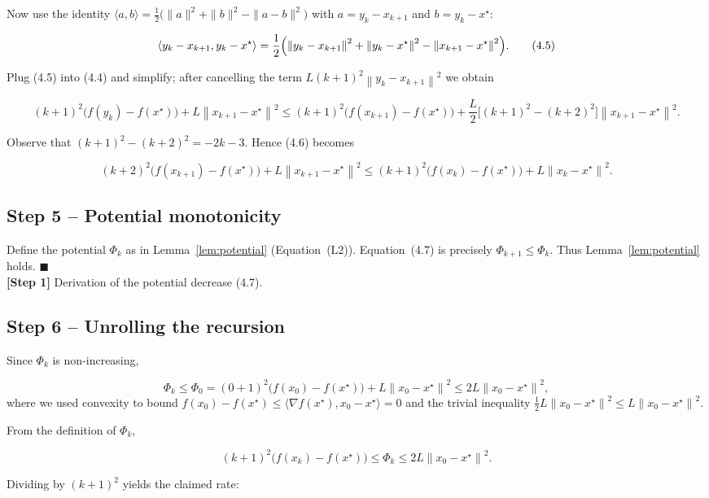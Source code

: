 \documentclass{article}
\newcommand{\grad}{\nabla}
\newcommand{\norm}[1]{\left\|#1\right\|}
\begin{document}
Now use the identity  
\(\langle a,b\rangle = \frac12\bigl(\|a\|^{2}+\|b\|^{2}-\|a-b\|^{2}\bigr)\) with
\(a=y_k-x_{k+1}\) and \(b=y_k-x^{\star}\):

\[
\langle y_k-x_{k+1},y_k-x^{\star}\rangle
 =\frac12\Bigl(\norm{y_k-x_{k+1}}^{2}
                +\norm{y_k-x^{\star}}^{2}
                -\norm{x_{k+1}-x^{\star}}^{2}\Bigr).
\tag{4.5}
\]

Plug (4.5) into (4.4) and simplify; after cancelling the term
\(L(k+1)^{2}\norm{y_k-x_{k+1}}^{2}\) we obtain

\[
(k+1)^{2}\bigl(f(y_k)-f(x^{\star})\bigr)
   +L\norm{x_{k+1}-x^{\star}}^{2}
\le (k+1)^{2}\bigl(f(x_{k+1})-f(x^{\star})\bigr)
   +\frac{L}{2}\bigl[(k+1)^{2}- (k+2)^{2}\bigr]\norm{x_{k+1}-x^{\star}}^{2}.
\tag{4.6}
\]

Observe that \((k+1)^{2}-(k+2)^{2}= -2k-3\). Hence (4.6) becomes

\[
(k+2)^{2}\bigl(f(x_{k+1})-f(x^{\star})\bigr)
   +L\norm{x_{k+1}-x^{\star}}^{2}
\le (k+1)^{2}\bigl(f(x_k)-f(x^{\star})\bigr)
   +L\norm{x_k-x^{\star}}^{2}.
\tag{4.7}
\]

\subsection*{Step 5 – Potential monotonicity}
Define the potential \(\Phi_k\) as in Lemma~\ref{lem:potential}
(Equation~(L2)).  
Equation~(4.7) is precisely \(\Phi_{k+1}\le\Phi_k\).  
Thus Lemma~\ref{lem:potential} holds. \hfill\(\blacksquare\) \\
\textbf{[Step 1] } Derivation of the potential decrease (4.7).

\subsection*{Step 6 – Unrolling the recursion}
Since \(\Phi_{k}\) is non‑increasing,

\[
\Phi_k \le \Phi_0
= (0+1)^{2}\bigl(f(x_0)-f(x^{\star})\bigr)+L\norm{x_0-x^{\star}}^{2}
\le 2L\norm{x_0-x^{\star}}^{2},
\tag{6.1}
\]
where we used convexity to bound \(f(x_0)-f(x^{\star})\le
\langle\grad f(x^{\star}),x_0-x^{\star}\rangle=0\) and the trivial inequality
\(\frac12L\norm{x_0-x^{\star}}^{2}\le L\norm{x_0-x^{\star}}^{2}\).

From the definition of \(\Phi_k\),

\[
(k+1)^{2}\bigl(f(x_k)-f(x^{\star})\bigr)
\le \Phi_k \le 2L\norm{x_0-x^{\star}}^{2}.
\]

Dividing by \((k+1)^{2}\) yields the claimed rate:
\end{document}
